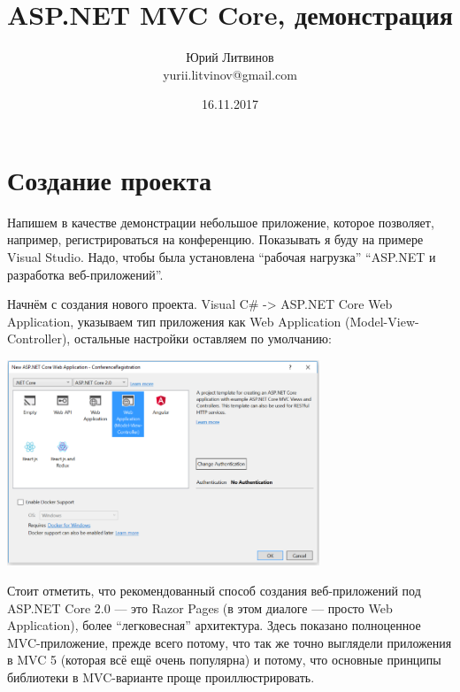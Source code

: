 \documentclass[a5paper]{article}
\title{ASP.NET MVC Core, демонстрация}
\author{Юрий Литвинов\\\small{yurii.litvinov@gmail.com}}
\date{16.11.2017}
\begin{document}
\maketitle
\thispagestyle{empty}

\section{Создание проекта}

Напишем в качестве демонстрации небольшое приложение, которое позволяет, например, регистрироваться на конференцию. Показывать я буду на примере Visual Studio. Надо, чтобы была установлена ``рабочая нагрузка'' ``ASP.NET и разработка веб-приложений''.

Начнём с создания нового проекта. Visual C\# -> ASP.NET Core Web Application, указываем тип приложения как Web Application (Model-View-Controller), остальные настройки оставляем по умолчанию:

\begin{center}
	\includegraphics[width=0.7\textwidth]{projectCreation.png}
\end{center}

Стоит отметить, что рекомендованный способ создания веб-приложений под ASP.NET Core 2.0 --- это Razor Pages (в этом диалоге --- просто Web Application), более ``легковесная'' архитектура. Здесь показано полноценное MVC-приложение,
прежде всего потому, что так же точно выглядели приложения в MVC 5 (которая всё ещё очень популярна) и потому, что основные принципы библиотеки в MVC-варианте проще проиллюстрировать.
\end{document}
